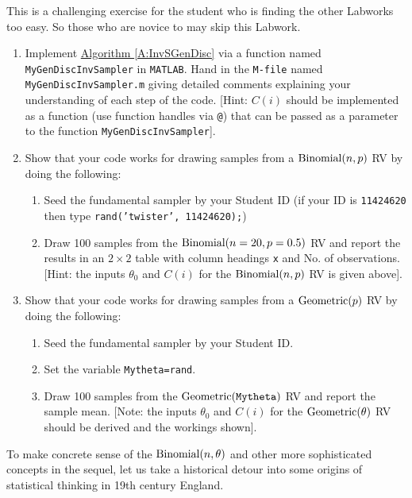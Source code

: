\begin{labwork}This is a challenging exercise for the student who is finding the other Labworks too easy. So those who are novice to \Matlab may skip this Labwork.
\begin{enumerate}
\item Implement \hyperref[A:InvSGenDisc]{Algorithm \ref*{A:InvSGenDisc}} via a function named {\tt MyGenDiscInvSampler} in {\tt MATLAB}.  Hand in the {\tt M-file} named {\tt MyGenDiscInvSampler.m} giving detailed comments explaining your understanding of each step of the code.  [Hint: $C(i)$ should be implemented as a function (use function handles via {\tt @}) that can be passed as a parameter to the function {\tt MyGenDiscInvSampler}].
\item Show that your code works for drawing samples from a $\mbox{{\rm Binomial}}(n,p)$ RV by doing the following:
\begin{enumerate}
\item Seed the fundamental sampler by your Student ID (if your ID is {\tt 11424620} then type {\tt rand('twister', 11424620);})
\item Draw 100 samples from the $\mbox{{\rm Binomial}}(n=20,p=0.5)$ RV and report the results in an $2 \times 2$ table with column headings {\tt x} and {No. of observations}.  [Hint: the inputs $\theta_0$ and $C(i)$ for the $\mbox{{\rm Binomial}}(n,p)$ RV is given above].
\end{enumerate}
\item Show that your code works for drawing samples from a $\mbox{{\rm Geometric}}(p)$ RV by doing the following:
\begin{enumerate}
\item Seed the fundamental sampler by your Student ID.
\item Set the variable {\tt Mytheta=rand}.
\item Draw 100 samples from the $\mbox{{\rm Geometric}}({\tt Mytheta})$ RV and report the sample mean.  [Note: the inputs $\theta_0$ and $C(i)$ for the $\mbox{{\rm Geometric}}(\theta)$ RV should be derived and the workings shown].
\end{enumerate}
\end{enumerate}
\end{labwork}

To make concrete sense of the $\mbox{{\rm Binomial}}(n,\theta)$ and other more sophisticated concepts in the sequel, let us take a historical detour into some origins of statistical thinking in 19th century England.

